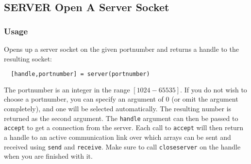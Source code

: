 %
%
%
\subsection{SERVER Open A Server Socket}
\subsubsection{Usage}
Opens up a server socket on the given portnumber and returns a handle
to the resulting socket:
\begin{verbatim}
  [handle,portnumber] = server(portnumber)
\end{verbatim}
The portnumber is an integer in the range $[1024-65535]$.  If you
do not wish to choose a portnumber, you can specify an argument of
$0$ (or omit the argument completely), and one will be selected 
automatically.  The resulting number is returned as the second argument.  
The \verb|handle| argument can then be passed to \verb|accept| to 
get a connection from the server.  Each call to \verb|accept|
will then return a handle to an active communication link over which 
arrays can be sent and received using \verb|send| and \verb|receive|.  Make sure
to call \verb|closeserver| on the handle when you are finished with it.
